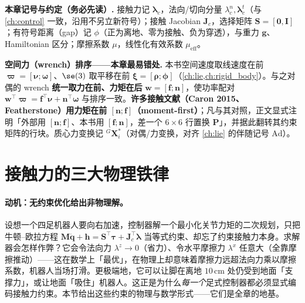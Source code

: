 \begin{note}
\textbf{本章记号与约定（务必先读）.}\;
接触力记 $\boldsymbol{\lambda}_c$，法向/切向分量 $\lambda_c^n,\boldsymbol{\lambda}_c^t$（与 \cref{ch:control} 一致，沿用不另立新符号）；接触 Jacobian $\mathbf{J}_c$，选择矩阵 $\mathbf{S}=[\mathbf{0},\mathbf{I}]$；有符号距离（gap）记 $\phi$（正为离地、零为接触、负为穿透），与重力 $\boldsymbol{g}$、Hamiltonian 区分；摩擦系数 $\mu$，线性化有效系数 $\mu_{\mathrm{eff}}$。

\textbf{空间力（wrench）排序——本章最易错处.}\;
本书空间速度取线速度在前 $\boldsymbol{\varpi}=[\boldsymbol{\nu};\boldsymbol{\omega}]$、$\se(3)$ 取平移在前 $\boldsymbol{\xi}=[\boldsymbol{\rho};\boldsymbol{\phi}]$（\cref{ch:lie,ch:rigid_body}）。与之对偶的 wrench \textbf{统一取力在前、力矩在后} $\boldsymbol{w}=[\boldsymbol{f};\boldsymbol{n}]$，使功率配对 $\boldsymbol{w}^\top\boldsymbol{\varpi}=\boldsymbol{f}^\top\boldsymbol{\nu}+\boldsymbol{n}^\top\boldsymbol{\omega}$ 与排序一致。\textbf{许多接触文献（Caron 2015、Featherstone）用力矩在前 $[\boldsymbol{n};\boldsymbol{f}]$（moment-first）}；凡与其对照，正文显式注明「外部用 $[\boldsymbol{n};\boldsymbol{f}]$、本书用 $[\boldsymbol{f};\boldsymbol{n}]$，差一个 $6\times6$ 行置换 $\mathbf{P}$」，并据此翻转其约束矩阵的行块。质心力变换记 ${}^G\mathbf{X}_i^*$（对偶/力变换，对齐 \cref{ch:lie} 的伴随记号 $\mathrm{Ad}$）。
\end{note}

\section{接触力的三大物理铁律}
\label{sec:contact-laws}

\paragraph{动机：无约束优化给出非物理解。}
设想一个四足机器人要向右加速，控制器解一个最小化关节力矩的二次规划，只把牛顿--欧拉方程 $\mathbf{M}\ddot{\boldsymbol{q}}+\boldsymbol{h}=\mathbf{S}^\top\boldsymbol{\tau}+\mathbf{J}_c^\top\boldsymbol{\lambda}$ 当等式约束、却忘了约束接触力本身。求解器会怎样作弊？它会令法向力 $\lambda^z\to0$（省力）、令水平摩擦力 $\lambda^x$ 任意大（全靠摩擦推动）——这在数学上「最优」，在物理上却意味着摩擦力远超法向力乘以摩擦系数，机器人当场打滑。更极端地，它可以让脚在离地 $10\,$cm 处仍受到地面「支撑力」，或让地面「吸住」机器人。这正是为什么\emph{每一个}足式控制器都必须显式编码接触力约束。本节给出这些约束的物理与数学形式——它们是全章的地基。

